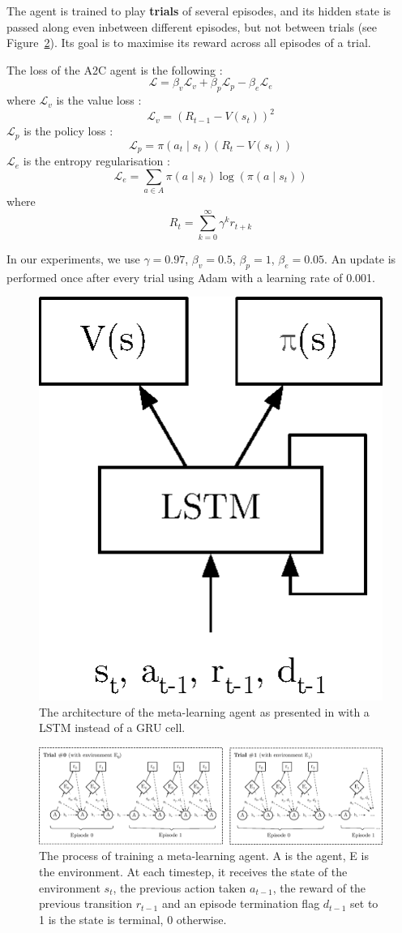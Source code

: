 \documentclass[letterpaper]{article}
\begin{document}
The agent is trained to play \textbf{trials} of several episodes, and its
hidden state is passed along even inbetween different episodes, but not
between trials (see Figure~\ref{fig:meta_learning_process}). Its goal is to 
maximise its reward across all episodes of a trial.

The loss of the A2C agent is the following : 
$$ \mathcal{L} = \beta_v \mathcal{L}_v + \beta_p \mathcal{L}_p - \beta_e 
 \mathcal{L}_e $$
where $\mathcal{L}_v$ is the value loss : 
$$ \mathcal{L}_v = (R_{t-1} - V(s_t))^2$$
$\mathcal{L}_p$ is the policy loss : 
$$ \mathcal{L}_p = \pi(a_t \mid s_t) (R_t - V(s_t))$$
$\mathcal{L}_e$ is the entropy regularisation : 
$$ \mathcal{L}_e = \sum\limits_{a \in A}\pi(a \mid s_t)\log(\pi(a \mid s_t))$$
where 
$$R_t = \sum\limits_{k=0}^{\infty} \gamma^k r_{t+k}$$

In our experiments, we use $\gamma = 0.97$, $\beta_v = 0.5$, $\beta_p = 1$, 
$\beta_e = 0.05$. An update is performed
once after every trial using Adam \citep{adam} with a learning rate of 0.001.\\


\begin{figure}[h]
	\centering
	\includegraphics[width=.4\linewidth]{fig/a2c_meta.eps}
	\caption{The architecture of the meta-learning agent as presented in
	\cite{learningtorl} with a LSTM instead of a GRU cell.}
	\label{fig:a2c}
\end{figure}


\begin{figure}[h]
	\centering
	\includegraphics[width=\textwidth]{fig/meta_learning_process.eps}
	\caption{The process of training a meta-learning agent. 
	A is the agent, E is the environment. At each
	timestep, it receives the state of the environment $s_t$, 
	the previous action taken $a_{t-1}$, the reward of the previous
	transition $r_{t-1}$ and an episode termination flag $d_{t-1}$ set to 1 is the
	state is terminal, 0 otherwise.}
	\label{fig:meta_learning_process}
\end{figure}
\end{document}

